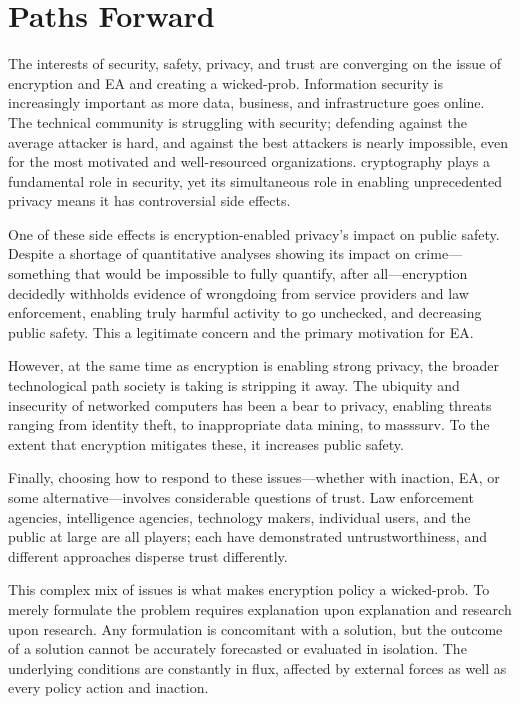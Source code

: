 \chapter{Paths Forward}
\label{chap-pathsforward}

The interests of security, safety, privacy, and trust are converging on the issue of encryption and \acl{EA} and
creating a \ac{wicked-prob}. Information security is increasingly important as more data, business, and infrastructure
goes online. The technical community is struggling with security; defending against the average attacker is hard, and
against the best attackers is nearly impossible, even for the most motivated and well-resourced organizations.
\Ac{cryptography} plays a fundamental role in security, yet its simultaneous role in enabling unprecedented privacy
means it has controversial side effects.

One of these side effects is encryption-enabled privacy's impact on public safety. Despite a shortage of quantitative
analyses showing its impact on crime---something that would be impossible to fully quantify, after all---encryption
decidedly withholds evidence of wrongdoing from service providers and law enforcement, enabling truly harmful activity
to go unchecked, and decreasing public safety. This a legitimate concern and the primary motivation for \ac{EA}.

However, at the same time as encryption is enabling strong privacy, the broader technological path society is taking is
stripping it away. The ubiquity and insecurity of networked computers has been a bear to privacy, enabling threats
ranging from identity theft, to inappropriate data mining, to \ac{masssurv}. To the extent that encryption mitigates
these, it increases public safety.

Finally, choosing how to respond to these issues---whether with inaction, \ac{EA}, or some alternative---involves
considerable questions of trust. Law enforcement agencies, intelligence agencies, technology makers, individual users,
and the public at large are all players; each have demonstrated untrustworthiness, and different approaches disperse
trust differently.

This complex mix of issues is what makes encryption policy a \ac{wicked-prob}. To merely formulate the problem requires
explanation upon explanation and research upon research. Any formulation is concomitant with a solution, but the outcome
of a solution cannot be accurately forecasted or evaluated in isolation. The underlying conditions are constantly in
flux, affected by external forces as well as every policy action and inaction.


